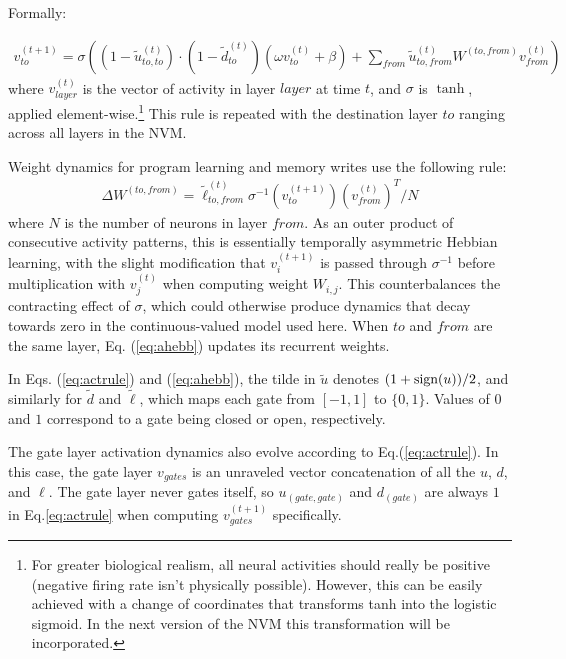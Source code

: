 \documentclass[pdftex,12pt,letterpaper]{article}
\newcommand{\sign}{\text{\upshape{sign}}}
\begin{document}
Formally:

\begin{align}
v^{(t+1)}_{to} = \sigma\left((1-\tilde{u}^{(t)}_{to,to})\cdot(1 - \tilde{d}^{(t)}_{to})(\omega v^{(t)}_{to} + \beta) + \sum_{from}\tilde{u}^{(t)}_{to,from}W^{(to,from)}v^{(t)}_{from}\right)
\label{eq:actrule}
\end{align}
where $v^{(t)}_{layer}$ is the vector of activity in layer $layer$ at time $t$, and $\sigma$ is $\tanh$, applied element-wise.\footnote{For greater biological realism, all neural activities should really be positive (negative firing rate isn't physically possible).  However, this can be easily achieved with a change of coordinates that transforms tanh into the logistic sigmoid.  In the next version of the NVM this transformation will be incorporated.}  This rule is repeated with the destination layer $to$ ranging across all layers in the NVM.

Weight dynamics for program learning and memory writes use the following rule:
\begin{align}
\Delta W^{(to,from)} = \tilde{\ell}^{(t)}_{to,from}\sigma^{-1}(v^{(t+1)}_{to})(v^{(t)}_{from})^T/N
\label{eq:ahebb}
\end{align}
where $N$ is the number of neurons in layer $from$.  As an outer product of consecutive activity patterns, this is essentially temporally asymmetric Hebbian learning, with the slight modification that $v^{(t+1)}_i$ is passed through $\sigma^{-1}$ before multiplication with $v^{(t)}_j$ when computing weight $W_{i,j}$.  This counterbalances the contracting effect of $\sigma$, which could otherwise produce dynamics that decay towards zero in the continuous-valued model used here.  When $to$ and $from$ are the same layer, Eq. (\ref{eq:ahebb}) updates its recurrent weights.

In Eqs. (\ref{eq:actrule}) and (\ref{eq:ahebb}), the tilde in $\tilde{u}$ denotes $(1+\sign(u))/2$, and similarly for $\tilde{d}$ and $\tilde{\ell}$,  which maps each gate from $[-1,1]$ to $\{0, 1\}$.  Values of $0$ and $1$ correspond to a gate being closed or open, respectively.

The gate layer activation dynamics also evolve according to Eq.\@ (\ref{eq:actrule}).  In this case, the gate layer $v_{gates}$ is an unraveled vector concatenation of all the $u$, $d$, and $\ell$.  The gate layer never gates itself, so $u_{(gate,gate)}$ and $d_{(gate)}$ are always $1$ in Eq.\@ \ref{eq:actrule} when computing $v_{gates}^{(t+1)}$ specifically.
\end{document}
